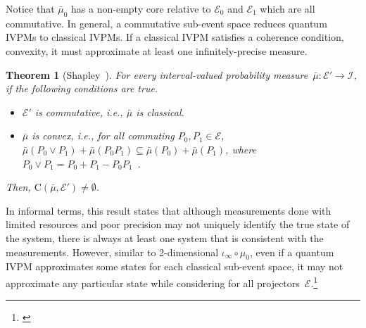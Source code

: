 \documentclass[english,reprint, aps, prl,superscriptaddress, showpacs,
showkeys, longbibliography, amsmath, amssymb]{revtex4-1}
\theoremstyle{plain}
\newtheorem{thm}{Theorem}
\theoremstyle{definition}
\newcommand{\events}{\ensuremath{\mathcal{E}}}
\newcommand{\yutsung}[1]{\begin{framed}\begin{minipage}{0.9\linewidth}\color{purple}{Yu-Tsung says: #1}\end{minipage}\end{framed}}
\newcommand{\coreBorn}{\mathrm{C}}
\begin{document}
Notice that $\bar{\mu}_{0}$ has a non-empty core relative to $\events_{0}$
and $\events_{1}$ which are all commutative. In general, a commutative
sub-event space reduces quantum IVPMs to classical IVPMs. If a classical
IVPM satisfies a coherence condition, convexity, it must approximate
at least one infinitely-precise measure.

\begin{thm}[Shapley~\cite{Shapley1971,Grabisch2016}]\label{thm:Shapley}For
every interval-valued probability measure~$\bar{\mu}:\events'\rightarrow\mathscr{I}$,
if the following conditions are true.
\begin{itemize}
\item $\events'$ is commutative, i.e., $\bar{\mu}$ is classical.
\item $\bar{\mu}$ is convex, i.e., for all commuting $P_{0},P_{1}\in\events$,
$\bar{\mu}\left(P_{0}\vee P_{1}\right)+\bar{\mu}\left(P_{0}P_{1}\right)\subseteq\bar{\mu}\left(P_{0}\right)+\bar{\mu}\left(P_{1}\right)$,
where $P_{0}\vee P_{1}=P_{0}+P_{1}-P_{0}P_{1}$~\cite{Griffiths2003}.
\end{itemize}
Then, $\coreBorn\left(\bar{\mu},\events'\right)\ne\emptyset$.\end{thm}

In informal terms, this result states that although measurements done
with limited resources and poor precision may not uniquely identify
the true state of the system, there is always at least one system
that is consistent with the measurements. However, similar to 2-dimensional
$\iota_{\infty}\circ\mu_{0}$, even if a quantum IVPM approximates
some states for each classical sub-event space, it may not approximate
any particular state while considering for all projectors~$\events$.\footnote{\yutsung{It seems that our example in 4 dimensions together with
relativity core would be unnecessary complex. Therefore, I roll our
example back to 3 dimensions.}}
\end{document}
